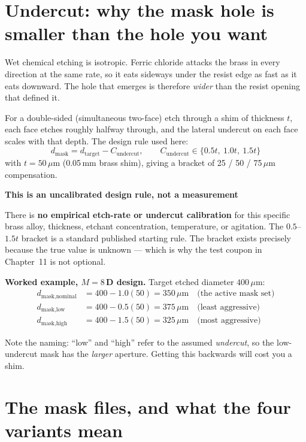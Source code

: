 \documentclass[11pt]{report}
\newenvironment{warnbox}[1]%
{\par\vspace{8pt}\begin{lrbox}{\wbsave}\begin{minipage}{0.88\textwidth}%
{\bfseries\color{warnred}#1}\par\vspace{4pt}\ignorespaces}%
{\end{minipage}\end{lrbox}%
\begin{center}\setlength{\fboxrule}{1.2pt}\setlength{\fboxsep}{8pt}%
\fcolorbox{warnred}{white}{\usebox{\wbsave}}\end{center}\vspace{8pt}\par}
\begin{document}
\section{Undercut: why the mask hole is smaller than the hole you want}

Wet chemical etching is isotropic. Ferric chloride attacks the brass in every direction at the
same rate, so it eats sideways under the resist edge as fast as it eats downward. The hole that
emerges is therefore \emph{wider} than the resist opening that defined it.

For a double-sided (simultaneous two-face) etch through a shim of thickness $t$, each face etches
roughly halfway through, and the lateral undercut on each face scales with that depth. The design
rule used here:
\begin{equation}
d_{\text{mask}} = d_{\text{target}} - C_{\text{undercut}},
\qquad
C_{\text{undercut}} \in \{0.5t,\ 1.0t,\ 1.5t\}
\label{eq:undercut}
\end{equation}
with $t = 50\,\mu$m (0.05\,mm brass shim), giving a bracket of 25 / 50 / 75\,$\mu$m compensation.

\begin{warnbox}{This is an uncalibrated design rule, not a measurement}
There is \textbf{no empirical etch-rate or undercut calibration} for this specific brass alloy,
thickness, etchant concentration, temperature, or agitation. The $0.5$--$1.5t$ bracket is a
standard published starting rule. The bracket exists precisely because the true value is unknown
--- which is why the test coupon in Chapter~11 is not optional.
\end{warnbox}

\textbf{Worked example, $M = 8$\,D design.} Target etched diameter $400\,\mu$m:
\begin{align}
d_{\text{mask,nominal}} &= 400 - 1.0(50) = 350\,\mu\text{m} \quad\text{(the active mask set)}\\
d_{\text{mask,low}} &= 400 - 0.5(50) = 375\,\mu\text{m} \quad\text{(least aggressive)}\\
d_{\text{mask,high}} &= 400 - 1.5(50) = 325\,\mu\text{m} \quad\text{(most aggressive)}
\end{align}

Note the naming: ``low'' and ``high'' refer to the assumed \emph{undercut}, so the low-undercut
mask has the \emph{larger} aperture. Getting this backwards will cost you a shim.

\section{The mask files, and what the four variants mean}
\end{document}
